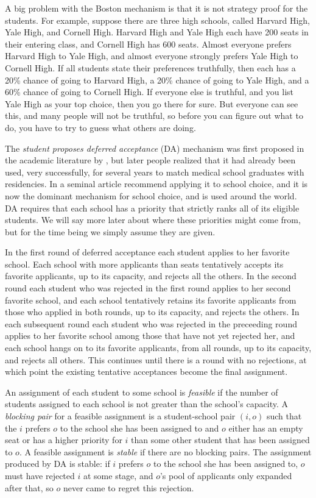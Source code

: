 \documentclass[12pt]{article}
\theoremstyle{definition}
\begin{document}
A big problem with the Boston mechanism is that it is not strategy
proof for the students.  For example, suppose there are three high
schools, called Harvard High, Yale High, and Cornell High.  Harvard
High and Yale High each have 200 seats in their entering class, and
Cornell High has 600 seats.  Almost everyone prefers Harvard High to
Yale High, and almost everyone strongly prefers Yale High to Cornell
High.  If all students state their preferences truthfully, then each
has a 20\% chance of going to Harvard High, a 20\% chance of going to
Yale High, and a 60\% chance of going to Cornell High.  If everyone
else is truthful, and you list Yale High as your top choice, then you
go there for sure.  But everyone can see this, and many people will
not be truthful, so before you can figure out what to do, you have to
try to guess what others are doing.

The \emph{student proposes deferred acceptance} (DA) mechanism was
first proposed in the academic literature by \cite{GaSh62}, but later
people realized that it had already been used, very successfully, for
several years to match medical school graduates with residencies.  In
a seminal article \cite{as03aer} recommend applying it to school
choice, and it is now the dominant mechanism for school choice, and is
used around the world.  DA requires that each school has a priority
that strictly ranks all of its eligible students.  We will say more
later about where these priorities might come from, but for the time
being we simply assume they are given.

In the first round of deferred acceptance each student applies to her
favorite school.  Each school with more applicants than seats
tentatively accepts its favorite applicants, up to its capacity, and
rejects all the others.  In the second round each student who was
rejected in the first round applies to her second favorite school, and
each school tentatively retains its favorite applicants from those who
applied in both rounds, up to its capacity, and rejects the others.
In each subsequent round each student who was rejected in the
preceeding round applies to her favorite school among those that have
not yet rejected her, and each school hangs on to its favorite
applicants, from all rounds, up to its capacity, and rejects all
others.  This continues until there is a round with no rejections, at
which point the existing tentative acceptances become the final assignment.

An assignment of each student to some school is \emph{feasible} if the
number of students assigned to each school is not greater than the
school's capacity.  A \emph{blocking pair} for a feasible assignment
is a student-school pair $(i,o)$ such that the $i$ prefers $o$ to the
school she has been assigned to and $o$ either has an empty seat or
has a higher priority for $i$ than some other student that has been
assigned to $o$.  A feasible assignment is \emph{stable} if there are
no blocking pairs.  The assignment produced by DA is stable: if $i$ prefers
$o$ to the school she has been assigned to, $o$ must have rejected $i$
at some stage, and $o$'s pool of applicants only expanded after that,
so $o$ never came to regret this rejection.
\end{document}
